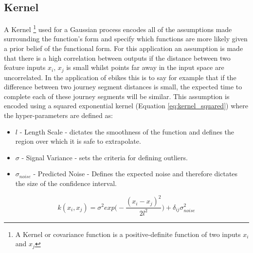 \documentclass[a4paper, 10pt]{article}
\numberwithin{equation}{section}
\begin{document}
\subsection{Kernel} 
\label{sec:kernel}
A Kernel \footnote{A Kernel or covariance function is a positive-definite function of two inputs $x_i$ and $x_j$} used for a Gaussian process encodes all of the assumptions made surrounding the function's form and specify which functions are more likely given a prior belief of the functional form. For this application an assumption is made that there is a high correlation between outputs if the distance between two feature inputs $x_i$, $x_j$ is small whilst points far away in the input space are uncorrelated. In the application of ebikes this is to say for example that if the difference between two journey segment distances is small, the expected time to complete each of these journey segments will be similar. This assumption is encoded using a squared exponential kernel (Equation \ref{eq:kernel_squared}) where the hyper-parameters are defined as:
\begin{itemize}
    \item $l$ - Length Scale - dictates the smoothness of the function and defines the region over which it is safe to extrapolate. 
    \item $\sigma$ - Signal Variance - sets the criteria for defining outliers. 
    \item $\sigma_{noise}$ - Predicted Noise - Defines the expected noise and therefore dictates the size of the confidence interval.
\end{itemize}

\begin{equation}
    \label{eq:kernel_squared}
    k(x_i,x_j)= \sigma^2exp \bigg(-\frac{(x_i-x_j)^2}{2l^2} \bigg)+ \delta_{ij}\sigma_{noise}^2
\end{equation}
\end{document}
